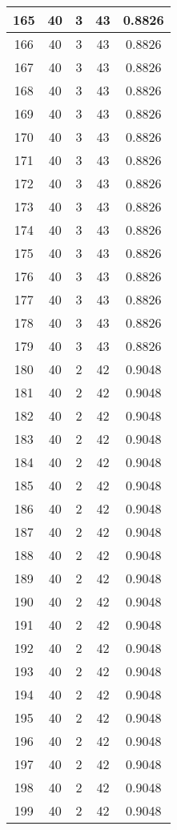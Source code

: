 \documentclass[letterpaper, 12pt]{article}
\begin{document}
\begin{longtable}{|c|c|c|c|c|}
\hline
165 & 40 & 3 & 43 & 0.8826 \\
\hline
166 & 40 & 3 & 43 & 0.8826 \\
\hline
167 & 40 & 3 & 43 & 0.8826 \\
\hline
168 & 40 & 3 & 43 & 0.8826 \\
\hline
169 & 40 & 3 & 43 & 0.8826 \\
\hline
170 & 40 & 3 & 43 & 0.8826 \\
\hline
171 & 40 & 3 & 43 & 0.8826 \\
\hline
172 & 40 & 3 & 43 & 0.8826 \\
\hline
173 & 40 & 3 & 43 & 0.8826 \\
\hline
174 & 40 & 3 & 43 & 0.8826 \\
\hline
175 & 40 & 3 & 43 & 0.8826 \\
\hline
176 & 40 & 3 & 43 & 0.8826 \\
\hline
177 & 40 & 3 & 43 & 0.8826 \\
\hline
178 & 40 & 3 & 43 & 0.8826 \\
\hline
179 & 40 & 3 & 43 & 0.8826 \\
\hline
180 & 40 & 2 & 42 & 0.9048 \\
\hline
181 & 40 & 2 & 42 & 0.9048 \\
\hline
182 & 40 & 2 & 42 & 0.9048 \\
\hline
183 & 40 & 2 & 42 & 0.9048 \\
\hline
184 & 40 & 2 & 42 & 0.9048 \\
\hline
185 & 40 & 2 & 42 & 0.9048 \\
\hline
186 & 40 & 2 & 42 & 0.9048 \\
\hline
187 & 40 & 2 & 42 & 0.9048 \\
\hline
188 & 40 & 2 & 42 & 0.9048 \\
\hline
189 & 40 & 2 & 42 & 0.9048 \\
\hline
190 & 40 & 2 & 42 & 0.9048 \\
\hline
191 & 40 & 2 & 42 & 0.9048 \\
\hline
192 & 40 & 2 & 42 & 0.9048 \\
\hline
193 & 40 & 2 & 42 & 0.9048 \\
\hline
194 & 40 & 2 & 42 & 0.9048 \\
\hline
195 & 40 & 2 & 42 & 0.9048 \\
\hline
196 & 40 & 2 & 42 & 0.9048 \\
\hline
197 & 40 & 2 & 42 & 0.9048 \\
\hline
198 & 40 & 2 & 42 & 0.9048 \\
\hline
199 & 40 & 2 & 42 & 0.9048 \\
\hline
\end{longtable}
\end{document}
